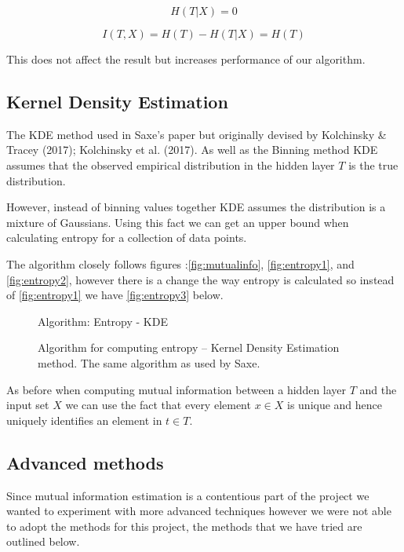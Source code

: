 \documentclass[dissertation.tex]{subfiles}
\begin{document}
\begin{equation}
  H(T|X) = 0 
\end{equation}

\begin{equation}
  I(T, X) = H(T) - H(T|X) = H(T) 
\end{equation}

This does not affect the result but increases performance of our algorithm.

\subsection{Kernel Density Estimation}

  The KDE method used in Saxe's paper but originally devised by Kolchinsky \&
  Tracey (2017); Kolchinsky et al. (2017). As well as the Binning method KDE
  assumes that the observed empirical distribution in the hidden layer $T$ is
  the true distribution. 

  However, instead of binning values together KDE assumes the distribution is a
  mixture of Gaussians. Using this fact we can get an upper bound when
  calculating entropy for a collection of data points.

  The algorithm closely follows figures :\autoref{fig:mutualinfo},
  \autoref{fig:entropy1}, and \autoref{fig:entropy2}, however there is a change
  the way entropy is calculated so instead of \autoref{fig:entropy1} we have
  \autoref{fig:entropy3} below.

\begin{figure}[H]
    \begin{pythonfigure}
      Algorithm: Entropy - KDE
    \end{pythonfigure}
    \caption{Algorithm for computing entropy -- Kernel Density Estimation method.
    The same algorithm as used by Saxe.}
    \label{fig:entropy3}
\end{figure} 

As before when computing mutual information between a hidden layer $T$ and the
input set $X$ we can use the fact that every element $x\in X$ is unique and
hence uniquely identifies an element in $t\in T$.

\subsection{Advanced methods} \label{ssection:advanced}

Since mutual information estimation is a contentious part of the project we
wanted to experiment with more advanced techniques however we were not able to
adopt the methods for this project, the methods that we have tried are outlined
below.
\end{document}
